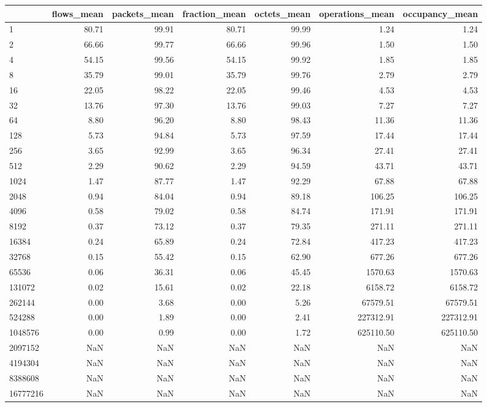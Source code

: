 \begin{tabular}{lrrrrrr}
\toprule
 & flows_mean & packets_mean & fraction_mean & octets_mean & operations_mean & occupancy_mean \\
\midrule
1 & 80.71 & 99.91 & 80.71 & 99.99 & 1.24 & 1.24 \\
2 & 66.66 & 99.77 & 66.66 & 99.96 & 1.50 & 1.50 \\
4 & 54.15 & 99.56 & 54.15 & 99.92 & 1.85 & 1.85 \\
8 & 35.79 & 99.01 & 35.79 & 99.76 & 2.79 & 2.79 \\
16 & 22.05 & 98.22 & 22.05 & 99.46 & 4.53 & 4.53 \\
32 & 13.76 & 97.30 & 13.76 & 99.03 & 7.27 & 7.27 \\
64 & 8.80 & 96.20 & 8.80 & 98.43 & 11.36 & 11.36 \\
128 & 5.73 & 94.84 & 5.73 & 97.59 & 17.44 & 17.44 \\
256 & 3.65 & 92.99 & 3.65 & 96.34 & 27.41 & 27.41 \\
512 & 2.29 & 90.62 & 2.29 & 94.59 & 43.71 & 43.71 \\
1024 & 1.47 & 87.77 & 1.47 & 92.29 & 67.88 & 67.88 \\
2048 & 0.94 & 84.04 & 0.94 & 89.18 & 106.25 & 106.25 \\
4096 & 0.58 & 79.02 & 0.58 & 84.74 & 171.91 & 171.91 \\
8192 & 0.37 & 73.12 & 0.37 & 79.35 & 271.11 & 271.11 \\
16384 & 0.24 & 65.89 & 0.24 & 72.84 & 417.23 & 417.23 \\
32768 & 0.15 & 55.42 & 0.15 & 62.90 & 677.26 & 677.26 \\
65536 & 0.06 & 36.31 & 0.06 & 45.45 & 1570.63 & 1570.63 \\
131072 & 0.02 & 15.61 & 0.02 & 22.18 & 6158.72 & 6158.72 \\
262144 & 0.00 & 3.68 & 0.00 & 5.26 & 67579.51 & 67579.51 \\
524288 & 0.00 & 1.89 & 0.00 & 2.41 & 227312.91 & 227312.91 \\
1048576 & 0.00 & 0.99 & 0.00 & 1.72 & 625110.50 & 625110.50 \\
2097152 & NaN & NaN & NaN & NaN & NaN & NaN \\
4194304 & NaN & NaN & NaN & NaN & NaN & NaN \\
8388608 & NaN & NaN & NaN & NaN & NaN & NaN \\
16777216 & NaN & NaN & NaN & NaN & NaN & NaN \\
\bottomrule
\end{tabular}
